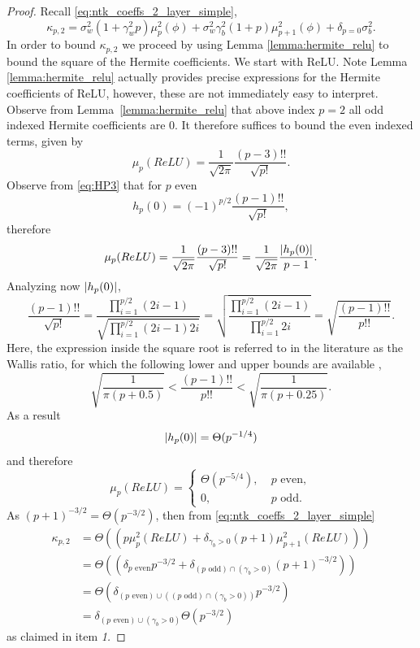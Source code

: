 \begin{proof}
      Recall \eqref{eq:ntk_coeffs_2_layer_simple},
    \[
        \kappa_{p,2} = \sigma_w^2(1 + \gamma_w^2 p)\mu_p^2(\phi) +\sigma_w^2 \gamma_b^2(1+p) \mu_{p+1}^2(\phi)+ \delta_{p=0} \sigma_b^2.
    \]
    In order to bound $\kappa_{p,2}$ we proceed by using Lemma \ref{lemma:hermite_relu} to bound the square of the Hermite coefficients. We start with ReLU. Note Lemma \ref{lemma:hermite_relu} actually provides precise expressions for the Hermite coefficients of ReLU, however, these are not immediately easy to interpret. Observe from Lemma~\ref{lemma:hermite_relu} that above index $p=2$ all odd indexed Hermite coefficients are $0$. It therefore suffices to bound the even indexed terms, given by 
    \[
    \mu_p(ReLU) = \frac{1}{\sqrt{2 \pi}}\frac{(p-3)!!}{\sqrt{p!}}.
    \]
    Observe from \eqref{eq:HP3} that for $p$ even
    \[
    h_p(0) = (-1)^{p/2} \frac{(p-1)!!}{\sqrt{p!}}, 
    \]
    therefore
    \[
    \mu_p(ReLU) = \frac{1}{\sqrt{2 \pi}}\frac{(p-3)!!}{\sqrt{p!}} =  \frac{1}{\sqrt{2 \pi}} \frac{\left\lvert h_p(0)\right\rvert}{p-1}.
    \]
    Analyzing now $\left\lvert h_p(0)\right\rvert$, 
    \[ \frac{(p - 1)!!}{\sqrt{p!}} = \frac{\prod_{i = 1}^{p/2} (2i - 1)}{\sqrt{\prod_{i = 1}^{p/2} (2i - 1) 2i}} = \sqrt{\frac{\prod_{i = 1}^{p/2} (2i - 1)}{\prod_{i = 1}^{p/2} 2i}} = \sqrt{\frac{(p - 1)!!}{p!!}}.\]
    Here, the expression inside the square root is referred to in the literature as the Wallis ratio, for which the following lower and upper bounds are available \cite{kazarinoff_1956},
    \begin{equation} \label{eq:wallis_ratio_bounds}
        \sqrt{\frac{1}{\pi(p+0.5)}} < \frac{(p - 1)!!}{p!!} < \sqrt{\frac{1}{\pi(p+0.25)}}.
    \end{equation}
    As a result
    \[
    \left\lvert h_p(0)\right\rvert = \Theta(p^{-1/4})
    \]
    and therefore
    \[
    \mu_p(ReLU) = 
    \begin{cases}
        \Theta(p^{-5/4}), \; &p \text{ even},\\
        0, \; &p \text{ odd}.
    \end{cases}
    \]
    As $(p+1)^{-3/2} = \Theta(p^{-3/2})$, then from \eqref{eq:ntk_coeffs_2_layer_simple}  
    \[
    \begin{aligned}
        \kappa_{p,2}  &= \Theta(( p \mu_p^2(ReLU) + \delta_{\gamma_b>0}(p+1) \mu_{p+1}^2(ReLU)))\\
        & = \Theta(( \delta_{p \text{ even}}p^{-3/2} + \delta_{(p \text{ odd})\cap(\gamma_b>0)}(p+1)^{-3/2}))\\
        &= \Theta \left( \delta_{(p \text{ even}) \cup \left((p \text{ odd})\cap(\gamma_b>0)\right)}p^{-3/2}\right)\\
        & = \delta_{(p \text{ even}) \cup(\gamma_b>0)} \Theta \left( p^{-3/2}\right) 
    \end{aligned}
    \]
    as claimed in item \emph{1.} 
    

\end{proof}
